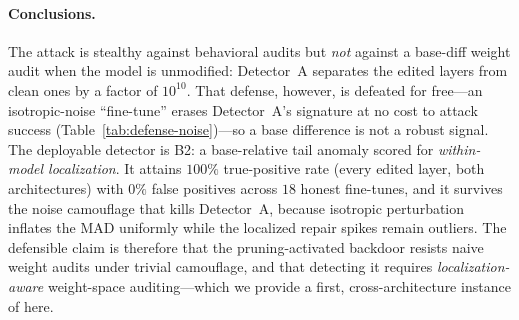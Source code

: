 \paragraph{Conclusions.}
The attack is stealthy against behavioral audits but \emph{not} against a base-diff weight audit when
the model is unmodified: Detector~A separates the edited layers from clean ones by a factor of
$10^{10}$. That defense, however, is defeated for free---an isotropic-noise ``fine-tune'' erases
Detector~A's signature at no cost to attack success (Table~\ref{tab:defense-noise})---so a base
difference is not a robust signal. The deployable detector is B2: a base-relative tail anomaly scored
for \emph{within-model localization}. It attains $100\%$ true-positive rate (every edited layer, both
architectures) with $0\%$ false positives across $18$ honest fine-tunes, and it survives the noise
camouflage that kills Detector~A, because isotropic perturbation inflates the MAD uniformly while the
localized repair spikes remain outliers. The defensible claim is therefore that the pruning-activated
backdoor resists naive weight audits under trivial camouflage, and that detecting it requires
\emph{localization-aware} weight-space auditing---which we provide a first, cross-architecture instance
of here.
